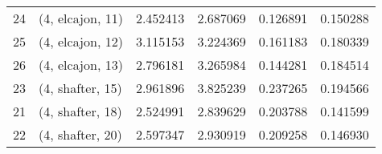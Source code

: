 \begin{tabular}{llrrrr}
24 &  (4, elcajon, 11) &   2.452413 &   2.687069 &   0.126891 &  0.150288 \\
25 &  (4, elcajon, 12) &   3.115153 &   3.224369 &   0.161183 &  0.180339 \\
26 &  (4, elcajon, 13) &   2.796181 &   3.265984 &   0.144281 &  0.184514 \\
23 &  (4, shafter, 15) &   2.961896 &   3.825239 &   0.237265 &  0.194566 \\
21 &  (4, shafter, 18) &   2.524991 &   2.839629 &   0.203788 &  0.141599 \\
22 &  (4, shafter, 20) &   2.597347 &   2.930919 &   0.209258 &  0.146930 \\
\bottomrule
\end{tabular}
